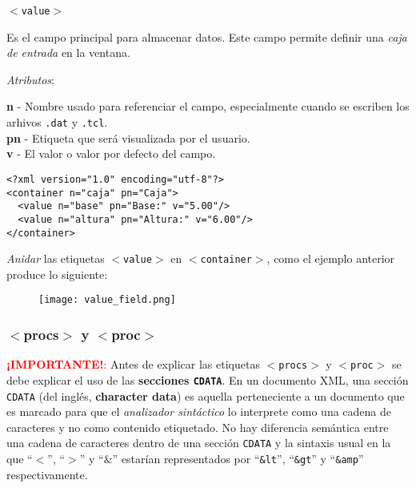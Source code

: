 \documentclass[10pt, a4paper, twocolumn]{article} %
\begin{document}
\vspace{0.20cm}
\begin{center}
	\texttt{$<$value$>$}
\end{center}
\vspace{0.20cm}

Es el campo principal para almacenar datos. Este campo permite definir una \textit{caja de entrada} en la ventana.

\vspace{0.15cm}
\textit{Atributos}:

\vspace{0.15cm}
	\textbf{n} - Nombre usado para referenciar el campo, especialmente cuando se escriben los arhivos \texttt{.dat} y \texttt{.tcl}.\\
	\textbf{pn} - Etiqueta que será visualizada por el usuario.\\
	\textbf{v} - El valor o valor por defecto del campo.\\
\vspace{0.15cm}

\lstset{language=XML} 
\begin{lstlisting}
<?xml version="1.0" encoding="utf-8"?>
<container n="caja" pn="Caja">
  <value n="base" pn="Base:" v="5.00"/>
  <value n="altura" pn="Altura:" v="6.00"/>
</container>
\end{lstlisting}


\textit{Anidar} las etiquetas \texttt{$<$value$>$} en \texttt{$<$container$>$}, como el ejemplo anterior produce lo siguiente:

\begin{figure}[hbtp!]
	\centering
	\texttt{[image: value\_field.png]}
\end{figure}

\subsubsection{$<$procs$>$ y $<$proc$>$}

\textcolor{red}{\textbf{¡IMPORTANTE!}:} Antes de explicar las etiquetas \texttt{$<$procs$>$} y \texttt{$<$proc$>$} se debe explicar el uso de las \textbf{secciones \texttt{CDATA}}. En un documento XML, una sección \texttt{CDATA} (del inglés, \textbf{character data}) es aquella perteneciente a un documento que es marcado para que el \textit{analizador sintáctico} lo interprete como una cadena de caracteres y no como contenido etiquetado. No hay diferencia semántica entre una cadena de caracteres dentro de una sección \texttt{CDATA} y la sintaxis usual en la que ``$<$'', ``$>$'' y ``$\&$'' estarían representados por ``\texttt{\&lt}'', ``\texttt{\&gt}'' y ``\texttt{\&amp}'' respectivamente.
\end{document}
